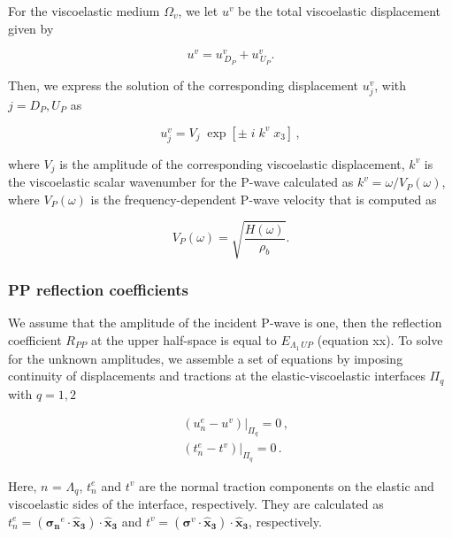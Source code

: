 \documentclass[draft]{agujournal2019}
\begin{document}
For the viscoelastic medium $\Omega_v$, we let  $u^v$ be the total viscoelastic displacement given by 
\begin{linenomath*}
\begin{equation}\label{Eq.8}
u^v=  u_{\,D_P}^v  + u_{\,U_P}^v.
\end{equation}
\end{linenomath*}

Then, we express the solution of the corresponding displacement $u_j^v$, with $j = D_P , U_P$ as
\begin{linenomath*}
\begin{equation}\label{Eq.11}
u_j^v = V_j \;\exp[ \pm\; i \; k^v \; x_3 ]\,,
\end{equation}
\end{linenomath*}
where $V_j$ is the amplitude of the corresponding viscoelastic displacement, $ k^v$ is the viscoelastic scalar wavenumber for the P-wave calculated as $ k^v=\omega / V_P(\omega)$, where $V_P(\omega)$ is the frequency-dependent P-wave velocity that is computed as
\begin{linenomath*}
\begin{equation}\label{Eq.12}
V_P(\omega) = \sqrt{ \frac{H(\omega) }{\rho_b} }.
\end{equation}
\end{linenomath*}

\subsubsection{PP reflection coefficients}
We assume that the amplitude of the incident P-wave is one, then the reflection coefficient $R_{PP}$ at the upper half-space is equal to $E_{\Lambda_1\, UP}$ (equation xx). To solve for the unknown amplitudes,  we assemble a set of equations by imposing continuity of displacements and tractions at the elastic-viscoelastic interfaces $\Pi_q$ with $q=1,2$
\begin{linenomath*}
\begin{equation}\label{Eq.x}
\begin{split}
&  \left. \left(  u_n^e -  u^v \right) \right \rvert_{\Pi_q} = 0 \,, \\
&  \left. \left( t_n^e  - t^v  \right) \right \rvert_{\Pi_q} = 0 \,.
\end{split}
\end{equation}
\end{linenomath*}
Here, $n$ = $\Lambda_q$, $t_n^e$ and $t^v$ are the normal traction components on the elastic and viscoelastic sides of the interface, respectively. They are calculated as $t_n^e =( \bm{\sigma_n}^e \cdot \bm{\hat {x}_3})\cdot \bm{\hat {x}_3} $ and  
$t^v =( \bm{\sigma}^v \cdot \bm{\hat {x}_3})\cdot \bm{\hat {x}_3} $, respectively.
\end{document}
